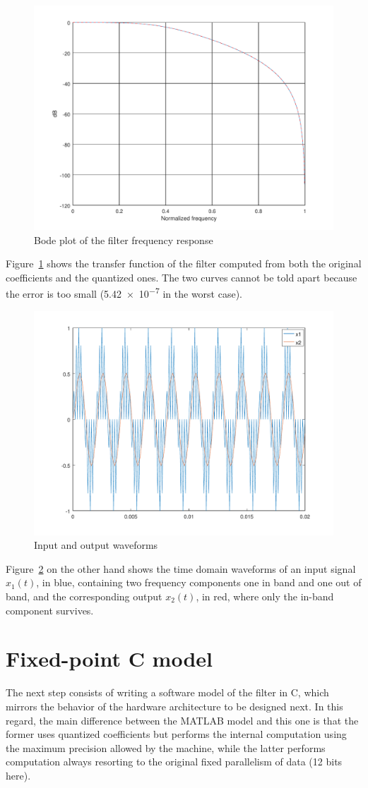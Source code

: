 \documentclass[a4paper]{article}
\begin{document}
\begin{figure}[hbtp]
    \centering
    \includegraphics[width=.75\linewidth]{media/tf.pdf}
    \caption{Bode plot of the filter frequency response}
    \label{fig:tf}
\end{figure}
Figure~\ref{fig:tf} shows the transfer function of the filter computed from both the original coefficients and the quantized ones. The two curves cannot be told apart because the error is too small (\num{5.42e-7} in the worst case).

\begin{figure}[hbtp]
    \centering
    \includegraphics[width=.8\linewidth]{media/sine.pdf}
    \caption{Input and output waveforms}
    \label{fig:sine}
\end{figure}
Figure~\ref{fig:sine} on the other hand shows the time domain waveforms of an input signal $x_1(t)$, in blue, containing two frequency components one in band and one out of band, and the corresponding output $x_2(t)$, in red, where only the in-band component survives.

\section{Fixed-point C model}
The next step consists of writing a software model of the filter in C, which mirrors the behavior of the hardware architecture to be designed next. In this regard, the main difference between the MATLAB model and this one is that the former uses quantized coefficients but performs the internal computation using the maximum precision allowed by the machine, while the latter performs computation always resorting to the original fixed parallelism of data (12 bits here).
\end{document}
